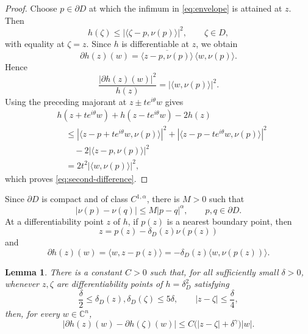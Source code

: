 \documentclass[12pt]{amsart}
\newtheorem{lemma}[theorem]{Lemma}
\newcommand{\C}{\mathbb C}
\begin{document}
\begin{proof}
Choose $p\in\partial D$ at which the infimum in
\eqref{eq:envelope} is attained at $z$. Then
\[
 h(\zeta)\le |\langle \zeta-p,\nu(p)\rangle|^2,
 \qquad \zeta\in D,
\]
with equality at $\zeta=z$. Since $h$ is differentiable at $z$, we obtain
\[
 \partial h(z)(w)
 =\overline{\langle z-p,\nu(p)\rangle}\,
 \langle w,\nu(p)\rangle.
\]
Hence
\[
 \frac{|\partial h(z)(w)|^2}{h(z)}
 =|\langle w,\nu(p)\rangle|^2.
\]
Using the preceding majorant at $z\pm te^{i\theta}w$ gives
\[
\begin{aligned}
 &h(z+t e^{i\theta}w)+h(z-t e^{i\theta}w)-2h(z)\\
 &\quad\le
 |\langle z-p+t e^{i\theta}w,\nu(p)\rangle|^2
 +|\langle z-p-t e^{i\theta}w,\nu(p)\rangle|^2\\
 &\qquad -2|\langle z-p,\nu(p)\rangle|^2\\
 &\quad=2t^2|\langle w,\nu(p)\rangle|^2,
\end{aligned}
\]
which proves \eqref{eq:second-difference}.
\end{proof}

Since $\partial D$ is compact and of class $C^{1,\alpha}$, there is
$M>0$ such that
\[
 |\nu(p)-\nu(q)|\le M|p-q|^\alpha,
 \qquad p,q\in\partial D.
\]
At a differentiability point $z$ of $h$, if $p(z)$ is a nearest boundary
point, then
\[
 z=p(z)-\delta_D(z)\nu(p(z))
\]
and
\begin{equation}\label{eq:normalrepresentation}
 \partial h(z)(w)
 =\langle w,z-p(z)\rangle
 =-\delta_D(z)\langle w,\nu(p(z))\rangle.
\end{equation}

\begin{lemma}\label{lem:gradosc}
There is a constant $C>0$ such that, for all sufficiently small $\delta>0$,
whenever $z,\zeta$ are differentiability points of $h=\delta_D^2$ satisfying
\[
 \frac\delta2\le\delta_D(z),\delta_D(\zeta)\le5\delta,
 \qquad |z-\zeta|\le\frac\delta4,
\]
then, for every $w\in\C^n$,
\begin{equation}\label{eq:gradestimate}
 |\partial h(z)(w)-\partial h(\zeta)(w)|
 \le C\bigl(|z-\zeta|+\delta^\gamma\bigr)|w|.
\end{equation}
\end{lemma}
\end{document}
